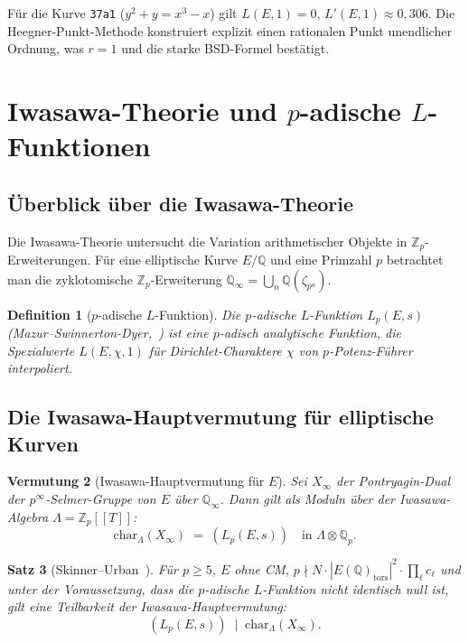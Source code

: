 \documentclass[12pt,a4paper]{article}
\newtheorem{theorem}{Satz}[section]
\newtheorem{conjecture}[theorem]{Vermutung}
\newtheorem{definition}[theorem]{Definition}
\theoremstyle{remark}
\begin{document}
Für die Kurve \texttt{37a1} ($y^2 + y = x^3 - x$) gilt $L(E,1)=0$,
$L'(E,1) \approx 0{,}306$. Die Heegner-Punkt-Methode konstruiert explizit einen rationalen
Punkt unendlicher Ordnung, was $r=1$ und die starke BSD-Formel bestätigt.

\section{Iwasawa-Theorie und $p$-adische $L$-Funktionen}

\subsection{Überblick über die Iwasawa-Theorie}

Die Iwasawa-Theorie untersucht die Variation arithmetischer Objekte in
$\mathbb{Z}_p$-Erweiterungen. Für eine elliptische Kurve $E/\mathbb{Q}$ und eine
Primzahl $p$ betrachtet man die zyklotomische $\mathbb{Z}_p$-Erweiterung
$\mathbb{Q}_\infty = \bigcup_n \mathbb{Q}(\zeta_{p^n})$.

\begin{definition}[$p$-adische $L$-Funktion]
  Die $p$-adische $L$-Funktion $L_p(E, s)$ (Mazur--Swinnerton-Dyer,~\cite{MazurSD1974})
  ist eine $p$-adisch analytische Funktion, die Spezialwerte $L(E, \chi, 1)$ für
  Dirichlet-Charaktere $\chi$ von $p$-Potenz-Führer interpoliert.
\end{definition}

\subsection{Die Iwasawa-Hauptvermutung für elliptische Kurven}

\begin{conjecture}[Iwasawa-Hauptvermutung für $E$]
  Sei $X_\infty$ der Pontryagin-Dual der $p^\infty$-Selmer-Gruppe von $E$ über
  $\mathbb{Q}_\infty$. Dann gilt als Moduln über der Iwasawa-Algebra $\Lambda = \mathbb{Z}_p[[T]]$:
  \[
    \mathrm{char}_\Lambda(X_\infty) \;=\; (L_p(E, s))
    \quad \text{in } \Lambda \otimes \mathbb{Q}_p.
  \]
\end{conjecture}

\begin{theorem}[Skinner--Urban~\cite{SkinnerUrban2014}]
  Für $p \geq 5$, $E$ ohne CM, $p \nmid N \cdot |E(\mathbb{Q})_{\mathrm{tors}}|^2 \cdot \prod_\ell c_\ell$
  und unter der Voraussetzung, dass die $p$-adische $L$-Funktion nicht identisch null ist,
  gilt eine Teilbarkeit der Iwasawa-Hauptvermutung:
  \[
    (L_p(E, s)) \;\mid\; \mathrm{char}_\Lambda(X_\infty).
  \]
\end{theorem}
\end{document}
